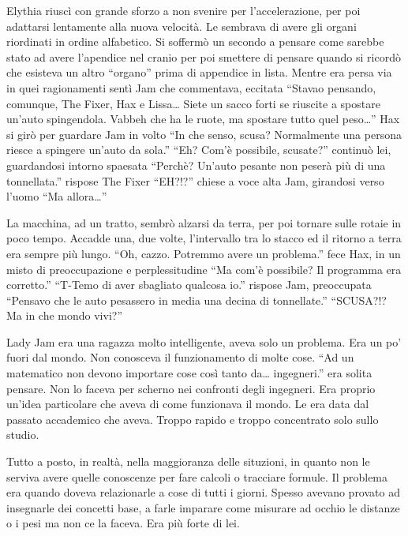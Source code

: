     Elythia riuscì con grande sforzo a non svenire per l'accelerazione, per
    poi adattarsi lentamente alla nuova velocità. Le sembrava di avere gli
    organi riordinati in ordine alfabetico. Si soffermò un secondo a
    pensare come sarebbe stato ad avere l'apendice nel cranio per poi
    smettere di pensare quando si ricordò che esisteva un altro ``organo''
    prima di appendice in lista. Mentre era persa via in quei ragionamenti
    sentì Jam che commentava, eccitata ``Stavao pensando, comunque, The
    Fixer, Hax e Lissa\dots{} Siete un sacco forti se riuscite a spostare
    un'auto spingendola. Vabbeh che ha le ruote, ma spostare tutto
    quel peso\dots{}'' Hax si girò per guardare Jam in volto ``In che
    senso, scusa? Normalmente una persona riesce a spingere un'auto da
    sola.'' ``Eh? Com'è possibile, scusate?'' continuò lei, guardandosi
    intorno spaesata ``Perchè? Un'auto pesante non peserà più di una
    tonnellata.'' rispose The Fixer ``EH?!?'' chiese a voce alta Jam,
    girandosi verso l'uomo ``Ma allora\dots{}''

    La macchina, ad un tratto, sembrò alzarsi da terra, per poi tornare
    sulle rotaie in poco tempo. Accadde una, due volte, l'intervallo tra lo
    stacco ed il ritorno a terra era sempre più lungo. ``Oh, cazzo.
    Potremmo avere un problema.'' fece Hax, in un misto di preoccupazione e
    perplessitudine ``Ma com'è possibile? Il programma era corretto.''
    ``T-Temo di aver sbagliato qualcosa io.'' rispose Jam, preoccupata
    ``Pensavo che le auto pesassero in media una decina di tonnellate.''
    ``SCUSA?!? Ma in che mondo vivi?''

    Lady Jam era una ragazza molto intelligente, aveva solo un problema.
    Era un po' fuori dal mondo. Non conosceva il funzionamento di molte
    cose. ``Ad un matematico non devono importare cose così tanto da\dots{}
    ingegneri.'' era solita pensare. Non lo faceva per scherno nei
    confronti degli ingegneri. Era proprio un'idea particolare che aveva di
    come funzionava il mondo. Le era data dal passato accademico che
    aveva. Troppo rapido e troppo concentrato solo sullo studio.

    Tutto a posto, in realtà, nella maggioranza delle situzioni, in quanto
    non le serviva avere quelle conoscenze per fare calcoli o tracciare
    formule. Il problema era quando doveva relazionarle a cose di tutti i
    giorni. Spesso avevano provato ad insegnarle dei concetti base, a farle
    imparare come misurare ad occhio le distanze o i pesi ma non ce la
    faceva. Era più forte di lei.

